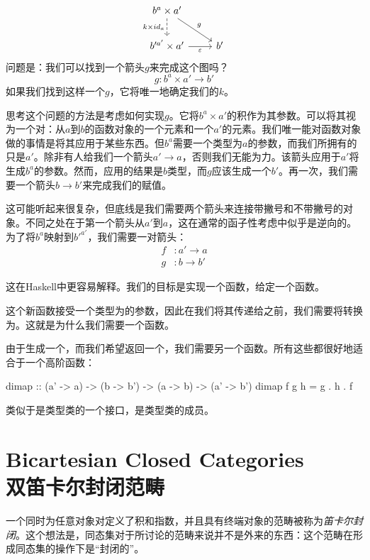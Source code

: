 \documentclass[DaoFP]{subfiles}
\begin{document}
\[
\begin{tikzcd}
b^a \times a'
\arrow[d, dashed, "k \times id_a"']
\arrow[rd, "g"]
\\
b'^{a'} \times a'
\arrow[r, "\varepsilon"']
& b'
\end{tikzcd}
\]
问题是：我们可以找到一个箭头$g$来完成这个图吗？
\[g \colon b^a \times a' \to b'\]
如果我们找到这样一个$g$，它将唯一地确定我们的$k$。

思考这个问题的方法是考虑如何实现$g$。它将$b^a \times a'$的积作为其参数。可以将其视为一个对：从$a$到$b$的函数对象的一个元素和一个$a'$的元素。我们唯一能对函数对象做的事情是将其应用于某些东西。但$b^a$需要一个类型为$a$的参数，而我们所拥有的只是$a'$。除非有人给我们一个箭头$a' \to a$，否则我们无能为力。该箭头应用于$a'$将生成$b^a$的参数。然而，应用的结果是$b$类型，而$g$应该生成一个$b'$。再一次，我们需要一个箭头$b \to b'$来完成我们的赋值。

这可能听起来很复杂，但底线是我们需要两个箭头来连接带撇号和不带撇号的对象。不同之处在于第一个箭头从$a'$到$a$，这在通常的函子性考虑中似乎是逆向的。为了将$b^a$映射到$b'^{a'}$，我们需要一对箭头：
\begin{align*}
f &\colon a' \to a \\
g &\colon b \to b'
\end{align*}

这在Haskell中更容易解释。我们的目标是实现一个函数，给定一个函数。

这个新函数接受一个类型为的参数，因此在我们将其传递给之前，我们需要将转换为。这就是为什么我们需要一个函数。

由于生成一个，而我们希望返回一个，我们需要另一个函数。所有这些都很好地适合于一个高阶函数：
\begin{haskell}
dimap :: (a' -> a) -> (b -> b') -> (a -> b) -> (a' -> b')
dimap f g h = g . h . f
\end{haskell}
类似于是类型类的一个接口，是类型类的成员。

\section{Bicartesian Closed Categories\\双笛卡尔封闭范畴}

一个同时为任意对象对定义了积和指数，并且具有终端对象的范畴被称为\emph{笛卡尔封闭}。这个想法是，同态集对于所讨论的范畴来说并不是外来的东西：这个范畴在形成同态集的操作下是“封闭的”。
\end{document}
